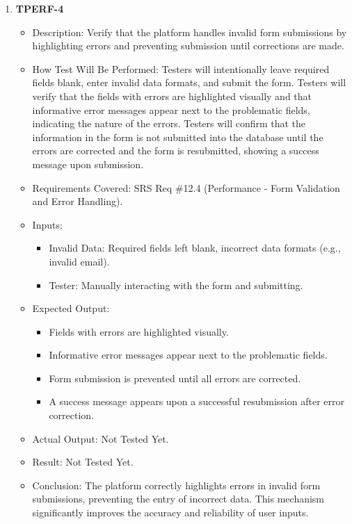 \documentclass[12pt, titlepage]{article}
\begin{document}
\begin{enumerate}
\item \textbf{TPERF-4}  
    \begin{itemize}
        \item Description: Verify that the platform handles invalid form submissions by highlighting errors and preventing submission until corrections are made.
        \item How Test Will Be Performed: Testers will intentionally leave required fields blank, enter invalid data formats, and submit the form. Testers will verify that the fields with errors are highlighted visually and that informative error messages appear next to the problematic fields, indicating the nature of the errors. Testers will confirm that the information in the form is not submitted into the database until the errors are corrected and the form is resubmitted, showing a success message upon submission.
        \item Requirements Covered: SRS Req \#12.4 (Performance - Form Validation and Error Handling).
        \item Inputs:  
            \begin{itemize}
                \item Invalid Data: Required fields left blank, incorrect data formats (e.g., invalid email).
                \item Tester: Manually interacting with the form and submitting.
            \end{itemize}
        \item Expected Output:  
            \begin{itemize}
                \item Fields with errors are highlighted visually.
                \item Informative error messages appear next to the problematic fields.
                \item Form submission is prevented until all errors are corrected.
                \item A success message appears upon a successful resubmission after error correction.
            \end{itemize}
        \item Actual Output: Not Tested Yet.
        \item Result: Not Tested Yet.
        \item Conclusion: The platform correctly highlights errors in invalid form submissions, preventing the entry of incorrect data.
		This mechanism significantly improves the accuracy and reliability of user inputs.
    \end{itemize}

\end{enumerate}
\end{document}
